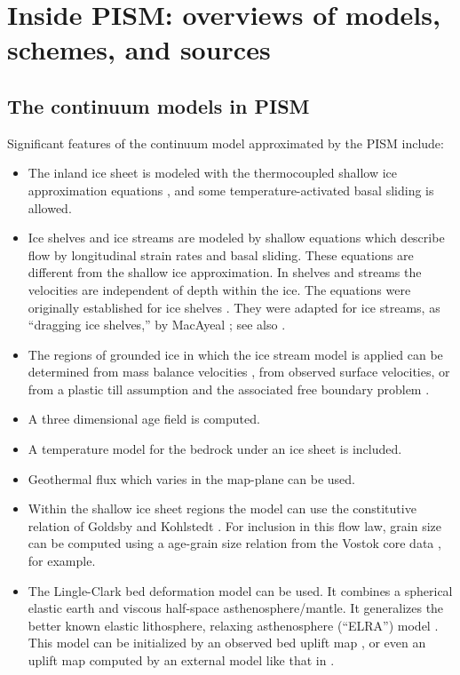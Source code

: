 \documentclass[11pt,final]{amsart}
\begin{document}
\clearpage\newpage
\section{Inside PISM: overviews of models, schemes, and sources}\label{sect:over}

\subsection{The continuum models in PISM}  Significant features of the continuum model approximated by the PISM include:\begin{itemize}
\item The inland ice sheet is modeled with the thermocoupled shallow ice approximation equations \cite{Fowler}, and some temperature-activated basal sliding is allowed.
\item Ice shelves and ice streams are modeled by shallow equations which describe flow by longitudinal strain rates and basal sliding.  These equations are different from the shallow ice approximation.  In shelves and streams the velocities are independent of depth within the ice.  The equations were originally established for ice shelves \cite{Morland,MorlandZainuddin,MacAyealetal,WeisGreveHutter}.  They were adapted for ice streams, as ``dragging ice shelves,'' by MacAyeal \cite{MacAyeal}; see also \cite{HulbeMacAyeal,SchoofStream}.
\item The regions of grounded ice in which the ice stream model is applied can be determined from mass balance velocities \cite{BamberVaughanJoughin}, from observed surface velocities, or from a plastic till assumption and the associated free boundary problem \cite{SchoofStream}.
\item A three dimensional age field is computed.
\item A temperature model for the bedrock under an ice sheet is included.
\item Geothermal flux which varies in the map-plane can be used.
\item Within the shallow ice sheet regions the model can use the constitutive relation of Goldsby and Kohlstedt \cite{GoldsbyKohlstedt,Peltieretal}.  For inclusion in this flow law, grain size can be computed using a age-grain size relation from the Vostok core data \cite{VostokCore}, for example.
\item The Lingle-Clark \cite{BLKfastearth,LingleClark} bed deformation model can be used.  It combines a spherical elastic earth and viscous half-space asthenosphere/mantle.  It generalizes the better known elastic lithosphere, relaxing asthenosphere (``ELRA'') model \cite{Greve2001}.  This model can be initialized by an observed bed uplift map \cite{BLKfastearth}, or even an uplift map computed by an external model like that in \cite{IvinsJames2005}.\end{itemize}
\end{document}
